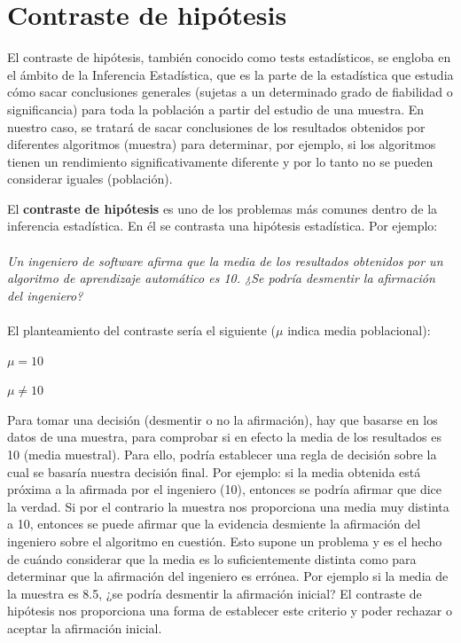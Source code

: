 
\chapter{Contraste de hipótesis}
El contraste de hipótesis, también conocido como tests estadísticos, se engloba en el ámbito de la
Inferencia Estadística, que es la parte de la estadística que estudia cómo sacar conclusiones generales
(sujetas a un determinado grado de fiabilidad o significancia) para toda la población a partir del
estudio de una muestra. En nuestro caso, se tratará de sacar conclusiones de los resultados obtenidos por
diferentes algoritmos (muestra) para determinar, por ejemplo, si los algoritmos tienen un rendimiento
significativamente diferente y por lo tanto no se pueden considerar iguales (población).

El \textbf{contraste de hipótesis} es uno de los problemas más comunes dentro de la inferencia
estadística. En él se contrasta una hipótesis estadística. Por ejemplo:\\\\
\textit{Un ingeniero de software afirma que la media de los resultados obtenidos por un algoritmo
de aprendizaje automático es 10. ¿Se podría desmentir la afirmación del ingeniero?}\\\\
El planteamiento del contraste sería el siguiente  ($\mu$ indica media poblacional):
\begin{center}
$ \mu = 10 $

$ \mu \neq 10 $
\end{center}

Para tomar una decisión (desmentir o no la afirmación), hay que basarse en los datos de una muestra, para
comprobar si en efecto la media de los resultados es 10 (media muestral). Para ello, podría establecer una
regla de decisión sobre la cual se basaría nuestra decisión final. Por ejemplo: si la media obtenida está
próxima a la afirmada por el ingeniero (10), entonces se podría afirmar que dice la verdad. Si por el
contrario la muestra nos proporciona una media muy distinta a 10, entonces se puede afirmar que la evidencia
desmiente la afirmación del ingeniero sobre el algoritmo en cuestión. Esto supone un problema y es el hecho
de cuándo considerar que la media es lo suficientemente distinta como para determinar que la afirmación del
ingeniero es errónea. Por ejemplo si la media de la muestra es 8.5, ¿se podría desmentir la afirmación
inicial? El contraste de hipótesis nos proporciona una forma de establecer este criterio y poder rechazar o
aceptar la afirmación inicial.

